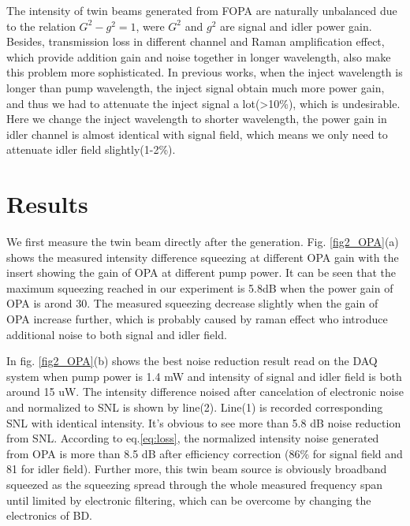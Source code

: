 \documentclass[9pt,twocolumn,twoside]{osajnl}
\begin{document}
The intensity of twin beams generated from FOPA are naturally unbalanced due to the relation $G^2-g^2=1$, were $G^2$ and $g^2$ are signal and idler power gain.
Besides, transmission loss in different channel and Raman amplification effect, which provide addition gain and noise together in longer wavelength, also make this problem more sophisticated.
In previous works\cite{guo12}, when the inject wavelength is longer than pump wavelength, the inject signal obtain much more power gain, and thus we had to attenuate the inject signal a lot(>10\%), which is undesirable.
Here we change the inject wavelength to shorter wavelength, the power gain in idler channel is almost identical with signal field, which means we only need to attenuate idler field slightly(1-2\%).



\section{Results}

We first measure the twin beam directly after the generation.
Fig. \ref{fig2_OPA}(a) shows the measured intensity difference squeezing at different OPA gain with the insert showing the gain of OPA at different pump power.
It can be seen that the maximum squeezing reached in our experiment is 5.8dB when the power gain of OPA is arond 30.
The measured squeezing decrease slightly when the gain of OPA increase further, which is probably caused by raman effect who introduce additional noise to both signal and idler field.

In fig. \ref{fig2_OPA}(b) shows the best noise reduction result read on the DAQ system when pump power is 1.4 mW and intensity of signal and idler field is both around 15 uW. The intensity difference noised after cancelation of electronic noise and normalized to SNL is shown by line(2). Line(1) is recorded corresponding SNL with identical intensity. It's obvious to see more than 5.8 dB noise reduction from SNL.
According to eq.\ref{eq:loss}, the normalized intensity noise generated from OPA is more than 8.5 dB after efficiency correction%
(86\% for signal field and 81 for idler field).	
Further more, this twin beam source is obviously broadband squeezed as the squeezing spread through the whole measured frequency span until limited by electronic filtering, which can be overcome by changing the electronics of BD.
\end{document}
